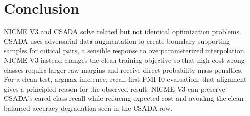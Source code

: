 \documentclass[11pt]{article}
\theoremstyle{definition}
\theoremstyle{plain}
\theoremstyle{remark}
\begin{document}
\section{Conclusion}

NICME V3 and CSADA solve related but not identical optimization problems.
CSADA uses adversarial data augmentation to create boundary-supporting samples for critical pairs, a sensible response to overparameterized interpolation.
NICME V3 instead changes the clean training objective so that high-cost wrong classes require larger raw margins and receive direct probability-mass penalties.
For a clean-test, argmax-inference, recall-first PMI-10 evaluation, that alignment gives a principled reason for the observed result:
NICME V3 can preserve CSADA's cared-class recall while reducing expected cost and avoiding the clean balanced-accuracy degradation seen in the CSADA row.
\end{document}
